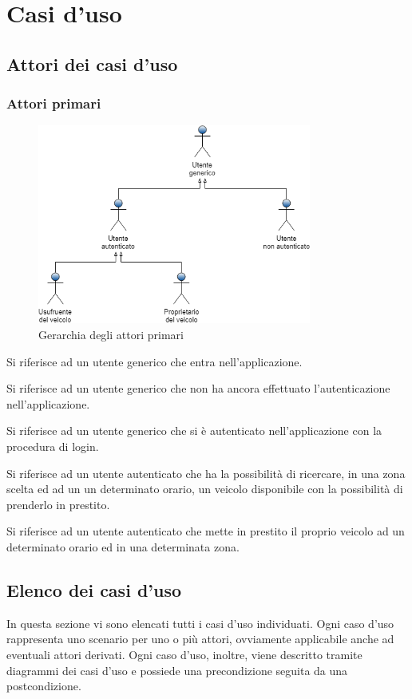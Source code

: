 \section{Casi d'uso} 
\subsection{Attori dei casi d'uso}
\subsubsection{Attori primari}
\begin{figure}[h]
	\includegraphics[width=9cm]{res/images/attori_primari.png}
	\centering
	\caption{Gerarchia degli attori primari}
\end{figure}
\begin{description}[style=nextline]
	\item[Utente generico]
	Si riferisce ad un utente generico che entra nell'applicazione.
	\item[Utente non autenticato]
	Si riferisce ad un utente generico che non ha ancora effettuato l'autenticazione nell'applicazione.
	\item[Utente autenticato]
	Si riferisce ad un utente generico che si è autenticato nell'applicazione con la procedura di login.
	\item[Usufruente del veicolo]
	Si riferisce ad un utente autenticato che ha la possibilità di ricercare, in una zona scelta ed ad un un determinato orario, un veicolo disponibile con la possibilità di prenderlo in prestito.
	\item[Proprietario del veicolo]
	Si riferisce ad un utente autenticato che mette in prestito il proprio veicolo ad un determinato orario ed in una determinata zona.	
\end{description}

\subsection{Elenco dei casi d'uso}
In questa sezione vi sono elencati tutti i casi d'uso individuati. Ogni caso d'uso rappresenta uno scenario per uno o più attori, ovviamente applicabile anche ad eventuali attori derivati. Ogni caso d'uso, inoltre, viene descritto tramite diagrammi dei casi d'uso e possiede una precondizione seguita da una postcondizione.
